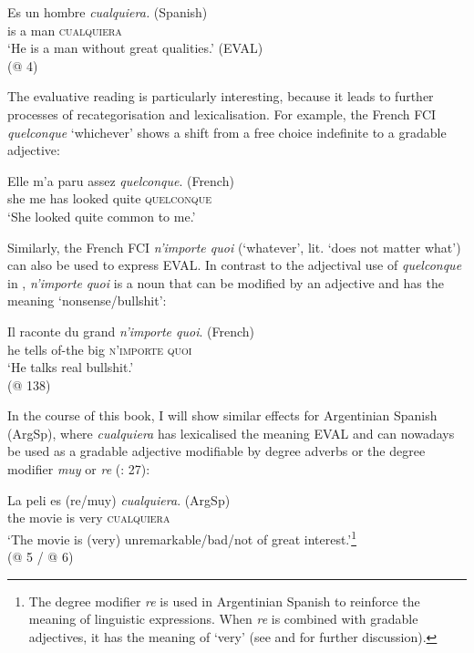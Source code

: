 \ea \label{ex:key:9}
    \gll Es un hombre \textit{cualquiera.} (Spanish)\\
    is a man \textsc{cualquiera}\\
    \glt ‘He is a man without great qualities.’ (EVAL)\\
    (@ 4)
\z

The evaluative reading is particularly interesting, because it leads to further processes of recategorisation and lexicalisation. For example, the French FCI \textit{quelconque} ‘whichever’ shows a shift from a free choice indefinite to a gradable adjective:

\ea \label{ex:key:10}
    \gll Elle m’a paru assez \textit{quelconque}. (French)\\
    she {me has} looked quite \textsc{quelconque}\\
    \glt ‘She looked quite common to me.’\\
    \citep[1530]{Vlachou2012}
\z

Similarly, the French FCI \textit{n’importe quoi} (‘whatever’, lit. ‘does not matter what’) can also be used to express EVAL. In contrast to the adjectival use of \textit{quelconque} in , \textit{n’importe} \textit{quoi} is a noun that can be modified by an adjective and has the meaning ‘nonsense/bullshit’:

\ea \label{ex:key:11}
    \gll Il raconte du grand \textit{n’importe quoi}. (French)\\
    he tells of-the big \textsc{n’importe quoi}\\
    \glt ‘He talks real bullshit.’\\
    (@ 138)
\z

In the course of this book, I will show similar effects for Argentinian Spanish (ArgSp), where \textit{cualquiera} has lexicalised the meaning EVAL and can nowadays be used as a gradable adjective modifiable by degree adverbs or the degree modifier \textit{muy} or \textit{re} (\citealt{Rizzosalierno2013}: 27):

\ea \label{ex:key:12}
    \gll La peli es {(re/muy)} \textit{cualquiera}. (ArgSp)\\
    the movie is { very} \textsc{cualquiera}\\
    \glt ‘The movie is (very) unremarkable/bad/not of great interest.’\footnote{The degree modifier \textit{re} is used in Argentinian Spanish to reinforce the meaning of linguistic expressions. When \textit{re} is combined with gradable adjectives, it has the meaning of ‘very’ (see \citealt{Rizzosalierno2013} and  for further discussion).}\\
    (@ 5 / @ 6)
\z


